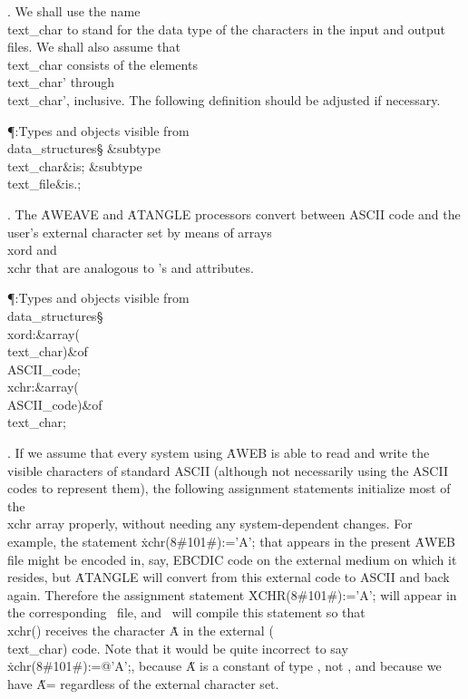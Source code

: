 . We shall use the name \\{text\_char} to stand for the data type of the
characters in the input and output files.  We shall also assume that
\\{text\_char} consists of the elements \\{text\_char}\?'\?
through  \\{text\_char}\?'\?, inclusive. The following
definition should be adjusted if necessary.

\Y\P\?\4:Types and objects visible from \\{data\_structures}\X\mathrel{+}\S%
\?\6
\&{subtype}\8\\{text\_char}\8\&{is}\8;\6
\&{subtype}\8\\{text\_file}\8\&{is}\8\?.\?;\par
\fi

. The \.{AWEAVE} and \.{ATANGLE} processors convert between ASCII code and
the user's external character set by means of arrays \\{xord} and \\{xchr}
that are analogous to \ADA's  and  attributes.

\Y\P\?\4:Types and objects visible from \\{data\_structures}\X\mathrel{+}\S%
\?\6
\\{xord}\?:\1\&{array}\8\1(\?\\{text\_char}\?\2)\2\8\&{of}\?\8\\{ASCII\_code};%
\6
\\{xchr}\?:\1\&{array}\8\1(\?\\{ASCII\_code}\?\2)\2\8\&{of}\?\8\\{text\_char};%
\par
\fi

. If we assume that every system using \.{AWEB} is able to read and write
the
visible characters of standard ASCII (although not necessarily using the
ASCII codes to represent them), the following assignment statements
initialize most of the \\{xchr} array properly, without needing any
system-dependent changes. For example, the statement
\.{xchr(8\#101\#):='A';} that appears in the present \.{AWEB} file might be
encoded in, say, {\mc EBCDIC} code on the external medium on which it
resides, but \.{ATANGLE} will convert from this external code to ASCII and
back again. Therefore the assignment statement \.{XCHR(8\#101\#):='A';}
will appear in the corresponding \ADA\ file, and \ADA\ will compile this
statement so that \\{xchr}\?()\? receives  the character \.A in the
external
(\\{text\_char}) code. Note that it would be quite incorrect to say
\.{xchr(8\#101\#):=@'A';}, because \H{A} is a constant of type
, not , and because we have \H{A}\?= regardless of
the
external character set.

